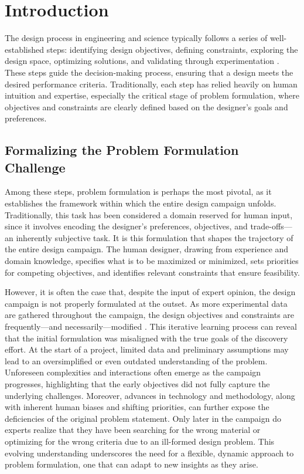 \documentclass[final,5p,times,twocolumn]{elsarticle}
\begin{document}
\section{Introduction}

The design process in engineering and science typically follows a series of well-established steps: identifying design objectives, defining constraints, exploring the design space, optimizing solutions, and validating through experimentation \cite{Arroyave2022ADesign}. These steps guide the decision-making process, ensuring that a design meets the desired performance criteria. Traditionally, each step has relied heavily on human intuition and expertise, especially the critical stage of problem formulation, where objectives and constraints are clearly defined based on the designer's goals and preferences.

\subsection{Formalizing the Problem Formulation Challenge}
Among these steps, problem formulation is perhaps the most pivotal, as it establishes the framework within which the entire design campaign unfolds. Traditionally, this task has been considered a domain reserved for human input, since it involves encoding the designer’s preferences, objectives, and trade-offs---an inherently subjective task. It is this formulation that shapes the trajectory of the entire design campaign. The human designer, drawing from experience and domain knowledge, specifies what is to be maximized or minimized, sets priorities for competing objectives, and identifies relevant constraints that ensure feasibility.

However, it is often the case that, despite the input of expert opinion, the design campaign is not properly formulated at the outset. As more experimental data are gathered throughout the campaign, the design objectives and constraints are frequently---and necessarily---modified \cite{acemi2024multi}. This iterative learning process can reveal that the initial formulation was misaligned with the true goals of the discovery effort. At the start of a project, limited data and preliminary assumptions may lead to an oversimplified or even outdated understanding of the problem. Unforeseen complexities and interactions often emerge as the campaign progresses, highlighting that the early objectives did not fully capture the underlying challenges. Moreover, advances in technology and methodology, along with inherent human biases and shifting priorities, can further expose the deficiencies of the original problem statement. Only later in the campaign do experts realize that they have been searching for the wrong material or optimizing for the wrong criteria due to an ill-formed design problem. This evolving understanding underscores the need for a flexible, dynamic approach to problem formulation, one that can adapt to new insights as they arise.
\end{document}
